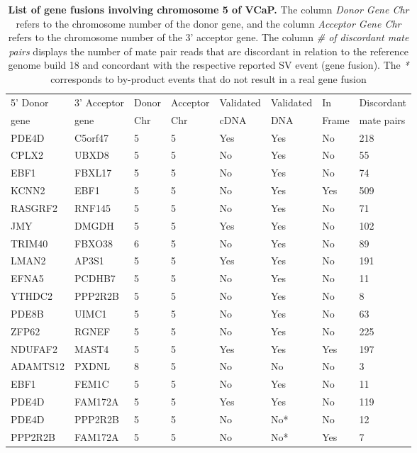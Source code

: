 \begin{table}[t!]
\begin{tabular}{llllllll}
\toprule
5' Donor&3' Acceptor&Donor&Acceptor&Validated&Validated&In&Discordant\\
gene&gene&Chr&Chr&cDNA&DNA&Frame&mate pairs\\
\midrule
PDE4D & C5orf47 & 5 & 5 & Yes & Yes & No & 218 \\
CPLX2 & UBXD8 & 5 & 5 & No & Yes & No & 55 \\
EBF1 & FBXL17 & 5 & 5 & No & Yes & No & 74 \\
KCNN2 & EBF1 & 5 & 5 & No & Yes & Yes & 509 \\
RASGRF2 & RNF145 & 5 & 5 & No & Yes & No & 71 \\
JMY & DMGDH & 5 & 5 & Yes & Yes & No & 102 \\
TRIM40 & FBXO38 & 6 & 5 & No & Yes & No & 89 \\
LMAN2 & AP3S1 & 5 & 5 & Yes & Yes & No & 191 \\
EFNA5 & PCDHB7 & 5 & 5 & No & Yes & No & 11 \\
YTHDC2 & PPP2R2B & 5 & 5 & No & Yes & No & 8 \\
PDE8B & UIMC1 & 5 & 5 & No & Yes & No & 63 \\
ZFP62 & RGNEF & 5 & 5 & No & Yes & No & 225 \\
NDUFAF2 & MAST4 & 5 & 5 & Yes & Yes & Yes & 197 \\
ADAMTS12 & PXDNL & 8 & 5 & No & No & No & 3 \\
EBF1 & FEM1C & 5 & 5 & No & Yes & No & 11 \\
PDE4D & FAM172A & 5 & 5 & Yes & Yes & No & 119 \\
PDE4D & PPP2R2B & 5 & 5 & No & No* & No & 12 \\
PPP2R2B & FAM172A & 5 & 5 & No & No* & Yes & 7 \\
\toprule
\end{tabular}
\caption{\textbf{List of gene fusions involving chromosome 5 of VCaP.} The column \textit{Donor Gene Chr} refers to the chromosome number of the donor gene, and the column \textit{Acceptor Gene Chr} refers to the chromosome number of the 3' acceptor gene. The column \textit{\# of discordant mate pairs} displays the number of mate pair reads that are discordant in relation to the reference genome build 18 and concordant with the respective reported SV event (gene fusion). The \textit{*} corresponds to by-product events that do not result in a real gene fusion}\label{table:fusions}
\end{table}



